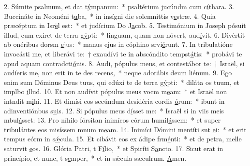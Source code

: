 2. Súmite psalmum, et dat t\uline{ý}mpanum:~* psaltérium jucúndm cum c\uline{í}thara.
3. Buccináte in Neoméni t\uline{u}ba,~* in insígni die solemnittis v\uline{e}stræ.
4. Quia præcéptum in Isr\uline{ë}l est:~* et judícium Do J\uline{a}cob.
5. Testimónium in Joseph pósuit illud, cum exíret de terra g\uline{ý}pti:~* linguam, quam non nóvert, aud\uline{í}vit.
6. Divértit ab onéribus dorsm \uline{e}jus:~* manus ejus in cóphino srvi\uline{é}runt.
7. In tribulatióne invocásti me, et liberávi te:~† exaudívi te in abscóndito tempst\uline{á}tis:~* probávi te apud aquam contradcti\uline{ó}nis.
8. Audi, pópulus meus, et contestábor te:~† Israël, si audíeris me, non erit in te des r\uline{e}cens,~* neque adorábis deum li\uline{é}num.
9. Ego enim sum Dóminus Deus tuus, qui edúxi te de terra g\uline{ý}pti:~* diláta os tuum, et implbo \uline{i}llud.
10. Et non audívit pópulus meus vocm m\uline{e}am:~* et Israël non intndit m\uline{i}hi.
11. Et dimísi eos secúndum desidéria cordis \uline{ó}rum:~* ibunt in adinventiónbus s\uline{u}is.
12. Si pópulus meus d\uline{í}sset me:~* Israël si in viis meis mbul\uline{á}sset:
13. Pro níhilo fórsitan inimícos eórum humil\uline{á}ssem:~* et super tribulántes eos misíssem mnum m\uline{e}am.
14. Inimíci Dómini mentíti snt \uline{e}i:~* et erit tempus eórm in s\uline{ǽ}cula.
15. Et cibávit eos ex ádipe frm\uline{é}nti:~* et de petra, melle saturvit \uline{e}os.
16. Glória Patri, t F\uline{í}lio,~* et Spiríti S\uline{a}ncto.
17. Sicut erat in princípio, et nunc, t s\uline{e}mper,~* et in sǽcula sæculrum. \uline{A}men.
